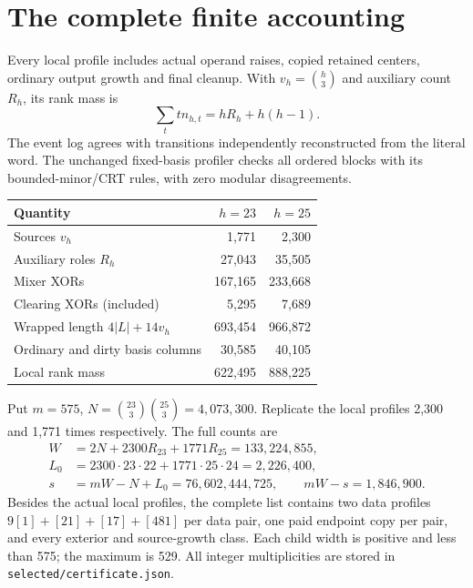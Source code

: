 \documentclass[11pt]{article}
\begin{document}
\section{The complete finite accounting}
Every local profile includes actual operand raises, copied retained centers,
ordinary output growth and final cleanup. With \(v_h=\binom h3\) and
auxiliary count \(R_h\), its rank mass is
\[
 \sum_t t n_{h,t}=hR_h+h(h-1).                        \tag{6}
\]
The event log agrees with transitions independently reconstructed from the
literal word. The unchanged fixed-basis profiler checks all ordered blocks
with its bounded-minor/CRT rules, with zero modular disagreements.
\begin{center}
\begin{tabular}{lrr}
\toprule
Quantity & \(h=23\) & \(h=25\)\\
\midrule
Sources \(v_h\) & 1,771 & 2,300\\
Auxiliary roles \(R_h\) & 27,043 & 35,505\\
Mixer XORs & 167,165 & 233,668\\
Clearing XORs (included) & 5,295 & 7,689\\
Wrapped length \(4|L|+14v_h\) & 693,454 & 966,872\\
Ordinary and dirty basis columns & 30,585 & 40,105\\
Local rank mass & 622,495 & 888,225\\
\bottomrule
\end{tabular}
\end{center}
Put \(m=575\), \(N=\binom{23}3\binom{25}3=4,073,300\). Replicate the
local profiles 2,300 and 1,771 times respectively. The full counts are
\[
\begin{split}
 W&=2N+2300R_{23}+1771R_{25}=133,224,855,\\
 L_0&=2300\cdot23\cdot22+1771\cdot25\cdot24=2,226,400,\\
 s&=mW-N+L_0=76,602,444,725,\qquad mW-s=1,846,900.
\end{split}                                                        \tag{7}
\]
Besides the actual local profiles, the complete list contains two data
profiles \(9[1]+[21]+[17]+[481]\) per data pair, one paid endpoint copy per
pair, and every exterior and source-growth class. Each child width is
positive and less than 575; the maximum is 529. All integer multiplicities
are stored in \texttt{selected/certificate.json}.
\end{document}

